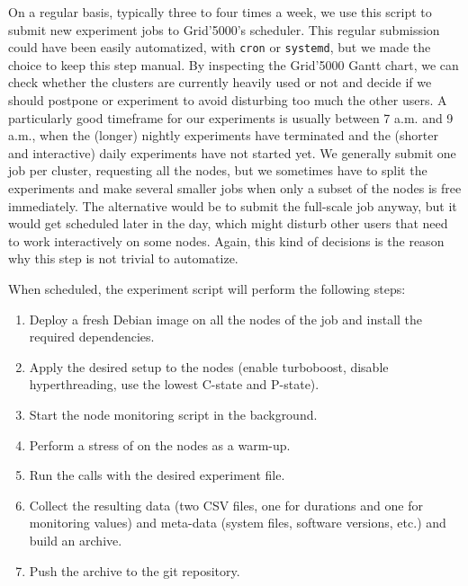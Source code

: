                On a regular basis, typically three to four times a week, we use this script to submit new experiment
                jobs to Grid'5000's scheduler. This regular submission could have been easily automatized, \eg with
                \texttt{cron} or \texttt{systemd}, but we made the choice to keep this step manual. By inspecting the
                Grid'5000 Gantt chart, we can check whether the clusters are currently heavily used or not and decide if
                we should postpone or experiment to avoid disturbing too much the other users. A particularly good
                timeframe for our experiments is usually between 7 a.m. and 9 a.m., when the (longer) nightly
                experiments have terminated and the (shorter and interactive) daily experiments have not started yet.
                We generally submit one job per cluster, requesting all the nodes, but we sometimes have to split the
                experiments and make several smaller jobs when only a subset of the nodes is free immediately. The
                alternative would be to submit the full-scale job anyway, but it would get scheduled later in the day,
                which might disturb other users that need to work interactively on some nodes. Again, this kind of
                decisions is the reason why this step is not trivial to automatize.

                When scheduled, the experiment script will perform the following steps:
                \begin{enumerate}
                    \item Deploy a fresh Debian image on all the nodes of the job and install the required dependencies.
                    \item Apply the desired setup to the nodes (\eg enable turboboost, disable hyperthreading, use the
                        lowest C-state and P-state).
                    \item Start the node monitoring script in the background.
                    \item Perform a stress of  on the nodes as a warm-up.
                    \item Run the \dgemm calls with the desired experiment file.
                    \item Collect the resulting data (two CSV files, one for \dgemm durations and one for monitoring
                        values) and meta-data (system files, software versions, etc.) and build an archive.
                    \item Push the archive to the git repository.
                \end{enumerate}

